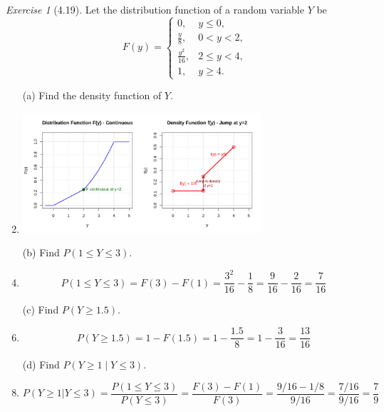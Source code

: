 \documentclass[12pt]{amsart}
\makeatletter
\theoremstyle{remark}
\newtheorem*{exercise}{Exercise}%
\renewenvironment{proof}[1][\proofname]{\par\doublespacing
  \pushQED{\qed}%
  \normalfont \topsep6\p@\@plus6\p@\relax
  \list{}{%
    \settowidth{\leftmargin}{\itshape\proofname:\hskip\labelsep}%
    \setlength{\labelwidth}{0pt}%
    \setlength{\itemindent}{-\leftmargin}%
  }%
  \item[\hskip\labelsep\itshape#1\@addpunct{:}]\ignorespaces
}{%
  \popQED\endlist\@endpefalse
  \singlespacing
}
\theoremstyle{mycomment}
\makeatother
\begin{document}
\begin{exercise}[4.19]
Let the distribution function of a random variable $Y$ be
$$F(y) = \begin{cases}
0, & y \leq 0, \\
\frac{y}{8}, & 0 < y < 2, \\
\frac{y^2}{16}, & 2 \leq y < 4, \\
1, & y \geq 4.
\end{cases}$$

\begin{enumerate}
    \item[(a)] Find the density function of $Y$.
\begin{proof}[Solution]
	\includegraphics[width=0.7\textwidth]{exercise_4_19.png}
\end{proof}
   \item[(b)] Find $P(1 \leq Y \leq 3)$.
\begin{proof}[Solution]
$$P(1 \leq Y \leq 3) = F(3) - F(1) = \frac{3^2}{16} - \frac{1}{8} = \frac{9}{16} - \frac{2}{16} = \frac{7}{16}$$
\end{proof}

    \item[(c)] Find $P(Y \geq 1.5)$.
\begin{proof}[Solution]
$$P(Y \geq 1.5) = 1 - F(1.5) = 1 - \frac{1.5}{8} = 1 - \frac{3}{16} = \frac{13}{16}$$
\end{proof}

    \item[(d)] Find $P(Y \geq 1 \mid Y \leq 3)$.
\begin{proof}[Solution]
$$P(Y \geq 1 | Y \leq 3) = \frac{P(1 \leq Y \leq 3)}{P(Y \leq 3)} = \frac{F(3) - F(1)}{F(3)} = \frac{9/16 - 1/8}{9/16} = \frac{7/16}{9/16} = \frac{7}{9}$$
\end{proof}

\end{enumerate}

\end{exercise}
\end{document}

